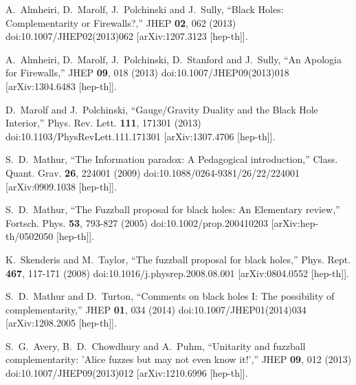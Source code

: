 \documentclass[a4paper,12pt]{article}
\begin{document}
\begin{thebibliography}{}
A.~Almheiri, D.~Marolf, J.~Polchinski and J.~Sully,
``Black Holes: Complementarity or Firewalls?,''
JHEP \textbf{02}, 062 (2013)
doi:10.1007/JHEP02(2013)062
[arXiv:1207.3123 [hep-th]].

A.~Almheiri, D.~Marolf, J.~Polchinski, D.~Stanford and J.~Sully,
``An Apologia for Firewalls,''
JHEP \textbf{09}, 018 (2013)
doi:10.1007/JHEP09(2013)018
[arXiv:1304.6483 [hep-th]].

D.~Marolf and J.~Polchinski,
``Gauge/Gravity Duality and the Black Hole Interior,''
Phys. Rev. Lett. \textbf{111}, 171301 (2013)
doi:10.1103/PhysRevLett.111.171301
[arXiv:1307.4706 [hep-th]].

S.~D.~Mathur,
``The Information paradox: A Pedagogical introduction,''
Class. Quant. Grav. \textbf{26}, 224001 (2009)
doi:10.1088/0264-9381/26/22/224001
[arXiv:0909.1038 [hep-th]].

S.~D.~Mathur,
``The Fuzzball proposal for black holes: An Elementary review,''
Fortsch. Phys. \textbf{53}, 793-827 (2005)
doi:10.1002/prop.200410203
[arXiv:hep-th/0502050 [hep-th]].

K.~Skenderis and M.~Taylor,
``The fuzzball proposal for black holes,''
Phys. Rept. \textbf{467}, 117-171 (2008)
doi:10.1016/j.physrep.2008.08.001
[arXiv:0804.0552 [hep-th]].

S.~D.~Mathur and D.~Turton,
``Comments on black holes I: The possibility of complementarity,''
JHEP \textbf{01}, 034 (2014)
doi:10.1007/JHEP01(2014)034
[arXiv:1208.2005 [hep-th]].

S.~G.~Avery, B.~D.~Chowdhury and A.~Puhm,
``Unitarity and fuzzball complementarity: 'Alice fuzzes but may not even know it!',''
JHEP \textbf{09}, 012 (2013)
doi:10.1007/JHEP09(2013)012
[arXiv:1210.6996 [hep-th]].


\end{thebibliography}
\end{document}
